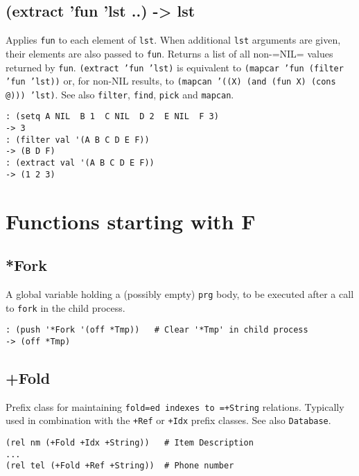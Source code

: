{{{{{ 
\section{(extract 'fun 'lst ..) -> lst}
\label{sec-8-1-5-21}


Applies \texttt{fun} to each element of \texttt{lst}. When additional \texttt{lst} arguments
are given, their elements are also passed to \texttt{fun}. Returns a list of
all non-=NIL= values returned by \texttt{fun}. \texttt{(extract 'fun 'lst)} is
equivalent to \texttt{(mapcar 'fun (filter 'fun 'lst))} or, for non-NIL
results, to \texttt{(mapcan '((X) (and (fun X) (cons @))) 'lst)}. See also
\texttt{filter}, \texttt{find}, \texttt{pick} and \texttt{mapcan}.


\begin{verbatim}
: (setq A NIL  B 1  C NIL  D 2  E NIL  F 3)
-> 3
: (filter val '(A B C D E F))
-> (B D F)
: (extract val '(A B C D E F))
-> (1 2 3)
\end{verbatim}


\chapter{Functions starting with F}
\label{sec-8-1-6}


 
\section{*Fork}
\label{sec-8-1-6-1}


A global variable holding a (possibly empty) \texttt{prg} body, to be executed
after a call to \texttt{fork} in the child process.


\begin{verbatim}
: (push '*Fork '(off *Tmp))   # Clear '*Tmp' in child process
-> (off *Tmp)
\end{verbatim}

 
\section{+Fold}
\label{sec-8-1-6-2}


Prefix class for maintaining \texttt{fold=ed indexes to =+String} relations.
Typically used in combination with the \texttt{+Ref} or \texttt{+Idx} prefix classes.
See also \texttt{Database}.


\begin{verbatim}
(rel nm (+Fold +Idx +String))   # Item Description
...
(rel tel (+Fold +Ref +String))  # Phone number
\end{verbatim}

}}}}}
